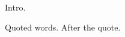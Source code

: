 \documentclass{article}
\begin{document}
Intro.

{\quote Quoted words.} After the quote.
\end{document}
